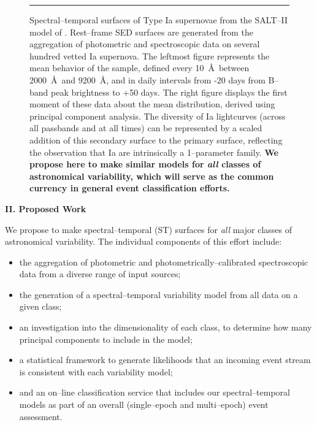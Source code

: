 \begin{figure}[t]
\centerline{ \hfil
{}} \smallskip
\caption[]{\footnotesize Spectral--temporal surfaces of Type Ia supernovae from
the SALT--II model of \cite{2007A&A...466...11G}.  Rest--frame SED surfaces are
generated from the aggregation of photometric and spectroscopic data on several
hundred vetted Ia supernova.  The leftmost figure represents the mean behavior
of the sample, defined every 10~\AA~between 2000~\AA~and 9200~\AA, and in daily
intervals from -20 days from B--band peak brightness to +50 days.  The right
figure displays the first moment of these data about the mean distribution,
derived using principal component analysis.  The diversity of Ia lightcurves
(across all passbands and at all times) can be represented by a scaled addition
of this secondary surface to the primary surface, reflecting the observation
that Ia are intrinsically a 1--parameter family.  {\bf We propose here to make
similar models for {\it all} classes of astronomical variability, which will
serve as the common currency in general event classification efforts.}} \medskip
\hrule \label{fig:salt2} \end{figure}

\bigskip \centerline{\bf II. Proposed Work} \smallskip

We propose to make spectral--temporal (ST) surfaces for {\it all} major classes
of astronomical variability.  The individual components of this effort include:

\begin{itemize}

\item the aggregation of photometric and photometrically--calibrated
spectroscopic data from a diverse range of input sources;

\item the generation of a spectral--temporal variability model from all data on
a given class;

\item an investigation into the dimensionality of each class, to determine how
many principal components to include in the model;

\item a statistical framework to generate likelihoods that an incoming event
stream is consistent with each variability model;

\item and an on--line classification service that includes our
spectral--temporal models as part of an overall (single--epoch and multi--epoch)
event assessment.

\end{itemize}

